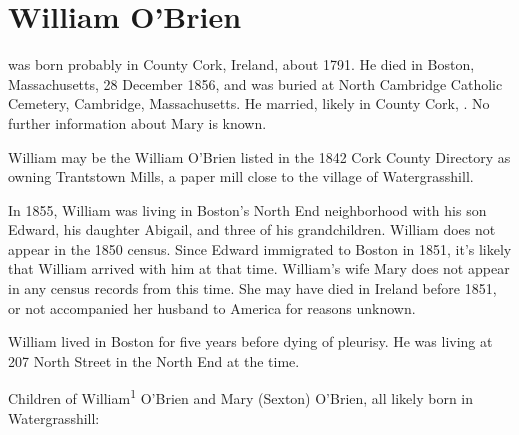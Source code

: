 \section{William O'Brien}

 was born probably in County Cork, Ireland, about 1791.\cite{Census1855William} He died in Boston, Massachusetts, 28 December 1856,\cite{William1OBrienDeath} and was buried at North Cambridge Catholic Cemetery, Cambridge, Massachusetts.\cite{DianaBerberenaLetter1} He married, likely in County Cork, .\cite{Michael2OBrienDeath,Abigail2OBrienDeath,Ann2OBrienDeath,Mary2OBrienDeath} No further information about Mary is known.

William may be the William O'Brien listed in the 1842 Cork County Directory as owning Trantstown Mills, a paper mill close to the village of Watergrasshill.\cite{Jacksons}

In 1855, William was living in Boston's North End neighborhood with his son Edward, his daughter Abigail, and three of his grandchildren.\cite{Census1855William,Wards} William does not appear in the 1850 census. Since Edward immigrated to Boston in 1851,\cite{Edward2OBrienNaturalization} it's likely that William arrived with him at that time. William's wife Mary does not appear in any census records from this time. She may have died in Ireland before 1851, or not accompanied her husband to America for reasons unknown.

William lived in Boston for five years before dying of pleurisy. He was living at 207 North Street in the North End at the time.\cite{William1OBrienDeath}

\begin{KidsIntro}
	Children of William\textsuperscript{1} O'Brien and Mary (Sexton) O'Brien, all likely born in Watergrasshill:
\end{KidsIntro}

